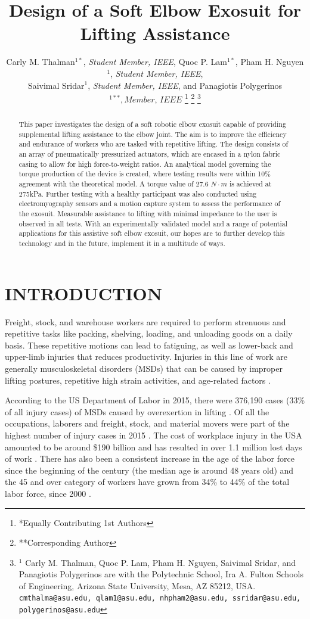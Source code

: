 \documentclass[letterpaper, 10 pt, conference]{ieeeconf}  %
\title{\LARGE \bf
Design of a Soft Elbow Exosuit for Lifting Assistance
}
\author{Carly M. Thalman$^{1*}$, \textit{Student Member, IEEE}, Quoc P. Lam$^{1*}$, Pham H. Nguyen$^{1}$, \textit{Student Member, IEEE}, 
\\Saivimal Sridar$^{1}$, \textit{Student Member, IEEE}, and Panagiotis Polygerinos$^{1**}, \textit{Member, IEEE}$%
\thanks{*Equally Contributing 1st Authors}%
\thanks{**Corresponding Author}%
\thanks{$^{1}$ Carly M. Thalman, Quoc P. Lam, Pham H. Nguyen, Saivimal Sridar, and Panagiotis Polygerinos are with the Polytechnic School, Ira A. Fulton Schools of Engineering, Arizona State University, Mesa, AZ 85212, USA.
        {\tt\small cmthalma@asu.edu, qlam1@asu.edu, nhpham2@asu.edu, ssridar@asu.edu, polygerinos@asu.edu}}%
}
\begin{document}
\maketitle
\thispagestyle{empty}
\pagestyle{empty}


\begin{abstract}

This paper investigates the design of a soft robotic elbow exosuit capable of providing supplemental lifting assistance to the elbow joint.  The aim is to improve the efficiency and endurance of workers who are tasked with repetitive lifting. The design consists of an array of pneumatically pressurized actuators, which are encased in a nylon fabric casing to allow for high force-to-weight ratios. An analytical model governing the torque production of the device is created, where testing results were within 10\% agreement with the theoretical model. A torque value of 27.6 $N \cdot m$ is achieved at 275kPa. Further testing with a healthy participant was also conducted using electromyography sensors and a motion capture system to assess the performance of the exosuit. Measurable assistance to lifting with minimal impedance to the user is observed in all tests. With an experimentally validated model and a range of potential applications for this assistive soft elbow exosuit, our hopes are to further develop this technology and in the future, implement it in a multitude of ways.    



\end{abstract}


\section{INTRODUCTION}

Freight, stock, and warehouse workers are required to perform strenuous and repetitive tasks like packing, shelving, loading, and unloading goods on a daily basis. These repetitive motions can lead to fatiguing, as well as lower-back and upper-limb injuries that reduces productivity. Injuries in this line of work are generally musculoskeletal disorders (MSDs) that can be caused by improper lifting postures, repetitive high strain activities, and age-related factors \cite{BLS2017}.

According to the US Department of Labor in 2015, there were 376,190 cases (33\% of all injury cases) of MSDs caused by overexertion in lifting \cite{BLS2016}. Of all the occupations, laborers and freight, stock, and material movers were part of the highest number of injury cases in 2015 \cite{BLS2016}. The cost of workplace injury in the USA amounted to be around \$190 billion and has resulted in over 1.1 million lost days of work \cite{Leigh2011}. There has also been a consistent increase in the age of the labor force since the beginning of the century (the median age is around 48 years old) and the 45 and over category of workers have grown from 34\% to 44\% of the total labor force, since 2000 \cite{Mislinski2017}. 
\end{document}
